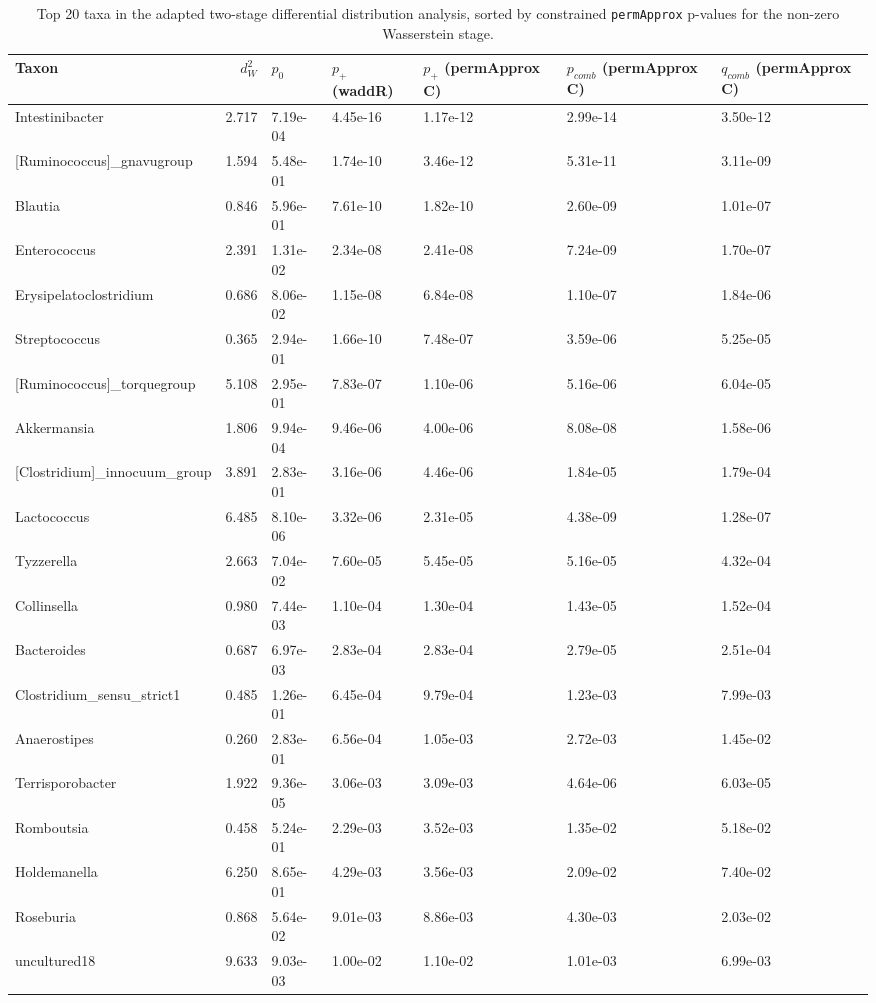 \begin{table}[!h]
\centering
\caption{\label{tab:application:diff-distribution-top-taxa}Top 20 taxa in the adapted two-stage differential distribution analysis, sorted by constrained \texttt{permApprox} p-values for the non-zero Wasserstein stage.}
\centering
\fontsize{8}{10}\selectfont
\begin{tabular}[t]{lrlllll}
\toprule
Taxon & $d_W^2$ & $p_{0}$ & $p_{+}$ (waddR) & $p_{+}$ (permApprox C) & $p_{comb}$ (permApprox C) & $q_{comb}$ (permApprox C)\\
\midrule
Intestinibacter & 2.717 & 7.19e-04 & 4.45e-16 & 1.17e-12 & 2.99e-14 & 3.50e-12\\
{}[Ruminococcus]_gnavugroup & 1.594 & 5.48e-01 & 1.74e-10 & 3.46e-12 & 5.31e-11 & 3.11e-09\\
Blautia & 0.846 & 5.96e-01 & 7.61e-10 & 1.82e-10 & 2.60e-09 & 1.01e-07\\
Enterococcus & 2.391 & 1.31e-02 & 2.34e-08 & 2.41e-08 & 7.24e-09 & 1.70e-07\\
Erysipelatoclostridium & 0.686 & 8.06e-02 & 1.15e-08 & 6.84e-08 & 1.10e-07 & 1.84e-06\\
\addlinespace
Streptococcus & 0.365 & 2.94e-01 & 1.66e-10 & 7.48e-07 & 3.59e-06 & 5.25e-05\\
{}[Ruminococcus]_torquegroup & 5.108 & 2.95e-01 & 7.83e-07 & 1.10e-06 & 5.16e-06 & 6.04e-05\\
Akkermansia & 1.806 & 9.94e-04 & 9.46e-06 & 4.00e-06 & 8.08e-08 & 1.58e-06\\
{}[Clostridium]_innocuum_group & 3.891 & 2.83e-01 & 3.16e-06 & 4.46e-06 & 1.84e-05 & 1.79e-04\\
Lactococcus & 6.485 & 8.10e-06 & 3.32e-06 & 2.31e-05 & 4.38e-09 & 1.28e-07\\
\addlinespace
Tyzzerella & 2.663 & 7.04e-02 & 7.60e-05 & 5.45e-05 & 5.16e-05 & 4.32e-04\\
Collinsella & 0.980 & 7.44e-03 & 1.10e-04 & 1.30e-04 & 1.43e-05 & 1.52e-04\\
Bacteroides & 0.687 & 6.97e-03 & 2.83e-04 & 2.83e-04 & 2.79e-05 & 2.51e-04\\
Clostridium_sensu_strict1 & 0.485 & 1.26e-01 & 6.45e-04 & 9.79e-04 & 1.23e-03 & 7.99e-03\\
Anaerostipes & 0.260 & 2.83e-01 & 6.56e-04 & 1.05e-03 & 2.72e-03 & 1.45e-02\\
\addlinespace
Terrisporobacter & 1.922 & 9.36e-05 & 3.06e-03 & 3.09e-03 & 4.64e-06 & 6.03e-05\\
Romboutsia & 0.458 & 5.24e-01 & 2.29e-03 & 3.52e-03 & 1.35e-02 & 5.18e-02\\
Holdemanella & 6.250 & 8.65e-01 & 4.29e-03 & 3.56e-03 & 2.09e-02 & 7.40e-02\\
Roseburia & 0.868 & 5.64e-02 & 9.01e-03 & 8.86e-03 & 4.30e-03 & 2.03e-02\\
uncultured18 & 9.633 & 9.03e-03 & 1.00e-02 & 1.10e-02 & 1.01e-03 & 6.99e-03\\
\bottomrule
\end{tabular}
\end{table}
